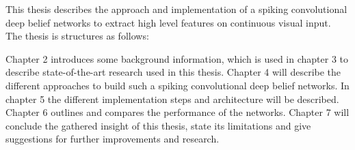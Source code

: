 This thesis describes the approach and implementation of a spiking convolutional deep belief networks to extract high level features on continuous visual input. The thesis is structures as follows:

Chapter 2 introduces some background information, which is used in chapter 3 to describe state-of-the-art research used in this thesis. 
Chapter 4 will describe the different approaches to build such a spiking convolutional deep belief networks. 
In chapter 5 the different implementation steps and  architecture will be described. 
Chapter 6 outlines and compares the performance of the networks. 
Chapter 7 will conclude the gathered insight of this thesis, state its limitations and give suggestions for further improvements and research.  